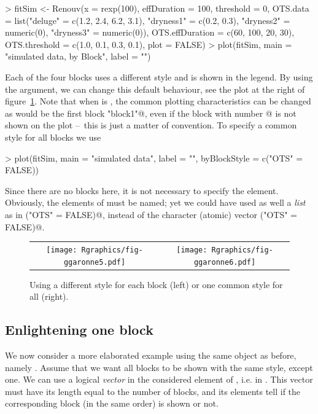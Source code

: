 \documentclass[a4paper]{report}
\begin{document}
\begin{Schunk}
\begin{Sinput}
> fitSim <- Renouv(x = rexp(100), effDuration = 100, threshold = 0,
                   OTS.data = list("deluge" = c(1.2, 2.4, 6.2, 3.1),
                       "dryness1" = c(0.2, 0.3),
                       "dryness2" = numeric(0),
                       "dryness3" = numeric(0)),
                   OTS.effDuration = c(60, 100, 20, 30),
                   OTS.threshold = c(1.0, 0.1, 0.3, 0.1),
                   plot = FALSE)
> plot(fitSim, main = "simulated data, by Block", label = "")
\end{Sinput}
\end{Schunk}
Each of the four blocks uses a different style and is shown 
in the legend. By using the \verb@byBlockStyle@ argument, 
we can change this default behaviour, see the plot at the  right  of
figure~\ref{GGaronne56}. Note that when \verb@byBlockStyle@
is \verb@TRUE@, the common plotting characteristics can be changed
as would be the first block \verb@"block1"@, even if the block with number @
is not shown on the plot --~this is just a matter of convention. To
specify a common style for all \verb@OTS@ blocks we use
\begin{Schunk}
\begin{Sinput}
> plot(fitSim, main = "simulated data", label = "", byBlockStyle = c("OTS" = FALSE))
\end{Sinput}
\end{Schunk}
Since there are no \verb@MAX@ blocks here, it is not necessary to 
specify the \verb@MAX@ element. Obviously,  the elements of \verb@byBlockStyle@ 
must be named; yet we could have used as well 
a \textit{list} as in \verb@list("OTS" = FALSE)@, instead of the character (atomic) vector
\verb@c("OTS" = FALSE)@.

\begin{figure}
   \centering
   \begin{tabular}{c c} 
     \texttt{[image: Rgraphics/fig-ggaronne5.pdf]} &
     \texttt{[image: Rgraphics/fig-ggaronne6.pdf]} 
   \end{tabular}
   \caption{\label{GGaronne56} Using a different style for each 
   block (left) or one common style for all (right).}
\end{figure}

\subsection{Enlightening one block}
We now consider a more elaborated example using the same \verb@Renouv@
object as before, namely \verb@fitSim@. Assume that we want all blocks to 
be shown with the same style, except one. We can use a logical 
\textit{vector} in the considered element of \verb@show@, i.e. in \verb@showOTS@.
This vector must have its length equal to the number of blocks, and
its elements tell if the corresponding block (in the same order) is shown or not. 
\end{document}
